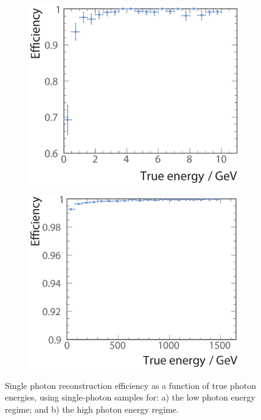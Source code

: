 
\begin{figure}[tbph]
\centering
    \begin{subfigure}[b]{0.45\textwidth}
        \includegraphics[width=\textwidth]{photon/singlePhotonEff3full}
        \caption{}
        \label{fig:photonSingleEffLow}
    \end{subfigure}
    \begin{subfigure}[b]{0.45\textwidth}
        \includegraphics[width=\textwidth]{photon/singlePhotonEff2}
        \caption{}
        \label{fig:photonSingleEff}
    \end{subfigure}
\caption[Single photon reconstruction efficiency as a function of energy.]
{Single photon reconstruction efficiency as a function of true photon energies, using single-photon samples for: a) the low photon energy regime; and b) the high photon energy regime.}
\label{fig:photonSingleEffPerformance}
\end{figure}

